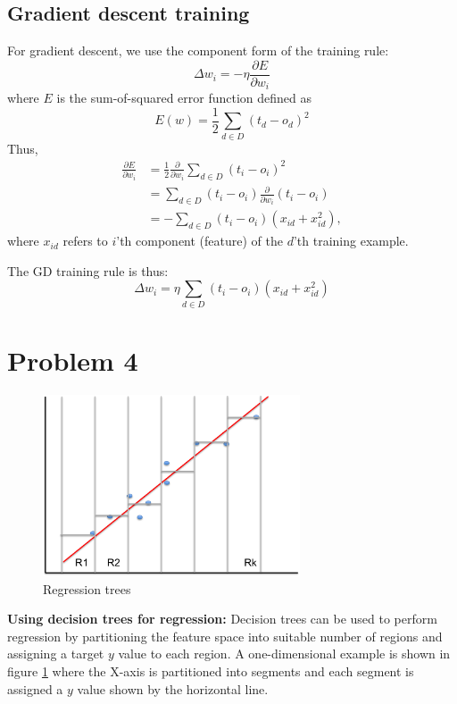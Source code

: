 \documentclass[10pt,letterpaper]{article}
\begin{document}
\subsection{Gradient descent training}
For gradient descent, we use the component form of the training rule:
\begin{equation}
  \Delta w_i = -\eta \frac{\partial E}{\partial w_i}
\end{equation}
where $E$ is the sum-of-squared error function defined as 
\begin{equation}
  E(w) = \frac{1}{2} \sum_{d\in D}(t_d - o_d)^2
\end{equation}
Thus,
\begin{align}
  \frac{\partial E}{\partial w_i} &= \frac{1}{2} \frac{\partial}{\partial w_i} \sum_{d \in D}(t_i - o_i)^2 \nonumber \\
  &= \sum_{d \in D}(t_i - o_i) \frac{\partial}{\partial w_i} (t_i-o_i)\nonumber \\
  &= -\sum_{d \in D}(t_i - o_i) (x_{id}+x_{id}^2),
\end{align}
where $x_{id}$ refers to $i$'th component (feature) of the $d$'th training example. 

The GD training rule is thus:
\begin{equation}
  \boxed{  \Delta w_i = \eta\sum_{d \in D}(t_i - o_i) (x_{id}+x_{id}^2)}
\end{equation}

\section{Problem 4}

\begin{figure}[!h]
 \includegraphics[width=3in]{./figures/regressiontrees.png}
 \caption{Regression trees\label{rtree}}
\end{figure}

{\bf Using decision trees for regression:} Decision trees can be used to perform regression by partitioning the feature space into suitable number of regions and assigning a target $y$ value to each region. A one-dimensional example is shown in figure \ref{rtree} where the X-axis is partitioned into segments and each segment is assigned a $y$ value shown by the horizontal line. 
\end{document}
